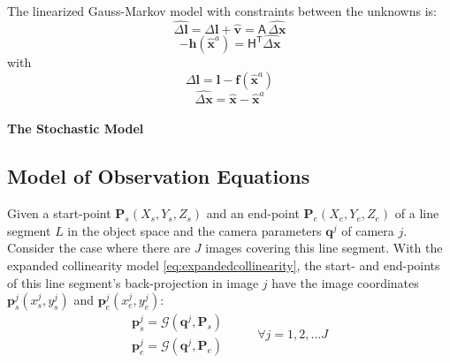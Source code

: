 The linearized Gauss-Markov model with constraints between the unknowns is:
\begin{equation} \label{eq:GM-ObsEq-linear}
\widehat{\Delta\boldsymbol l}=\Delta\boldsymbol l+\widehat{\boldsymbol v}=\mathsf{A}\,\widehat{\Delta\boldsymbol x}
\end{equation}
\begin{equation} \label{eq:GM-ConEq-linear}
-\boldsymbol h(\widehat{\boldsymbol x}^a)=\mathsf{H^T}\widehat{\Delta\boldsymbol x}
\end{equation}
with
\begin{equation} \label{eq:GM-ObsEq-linear-l}
\Delta\boldsymbol l=\boldsymbol l-\boldsymbol f(\widehat{\boldsymbol x}^a)
\end{equation}
\begin{equation} \label{eq:GM-ObsEq-linear-x}
\widehat{\Delta\boldsymbol x}=\widehat{\boldsymbol x}-\widehat{\boldsymbol x}^a
\end{equation}

\paragraph{The Stochastic Model}




\subsection{Model of Observation Equations}
\label{subsec:ObsEqua}

Given a start-point $\mathbf{P}_s(X_s,Y_s,Z_s)$ and an end-point $\mathbf{P}_e(X_e,Y_e,Z_e)$ of a line segment $L$ in the object space and the camera parameters $\mathbf{q}^j$ of camera $j$. Consider the case where there are $J$ images covering this line segment. With the expanded collinearity model \eqref{eq:expandedcollinearity}, the start- and end-points of this line segment's back-projection in image $j$ have the image coordinates $\mathbf{p}^j_s(x^j_s,y^j_s)$ and $\mathbf{p}^j_e(x^j_e,y^j_e)$:
\begin{equation} \label{eq:obsmodel-collinearity}
\begin{split}
\mathbf{p}^j_s = \mathcal{G}(\mathbf{q}^j,\mathbf{P}_s)\\
\mathbf{p}^j_e = \mathcal{G}(\mathbf{q}^j,\mathbf{P}_e)
\end{split}
\qquad
\begin{split}
\forall j=1,2,...J
\end{split}
\end{equation}

